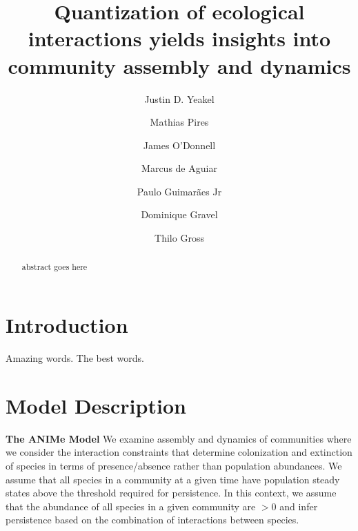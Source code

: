 \documentclass[twocolumn,preprintnumbers,amsmath,amssymb,superscriptaddress]{revtex4}
\begin{document}
\author{Justin D. Yeakel} 

\author{Mathias Pires} \affiliation{}

\author{James O'Donnell} \affiliation{}

\author{Marcus de Aguiar} \affiliation{}

\author{Paulo Guimar\~aes Jr} \affiliation{}

\author{Dominique Gravel} \affiliation{}

\author{Thilo Gross} \affiliation{}

\title{Quantization of ecological interactions yields insights into community assembly and dynamics}


\begin{abstract}
abstract goes here
\end{abstract}

\maketitle

\section*{Introduction}

Amazing words. The best words.



\section*{Model Description}

{\bf The ANIMe Model} 
We examine assembly and dynamics of communities where we consider the interaction constraints that determine colonization and extinction of species in terms of presence/absence rather than population abundances.
We assume that all species in a community at a given time have population steady states above the threshold required for persistence.
In this context, we assume that the abundance of all species in a given community are $>0$ and infer persistence based on the combination of interactions between species.
\end{document}
